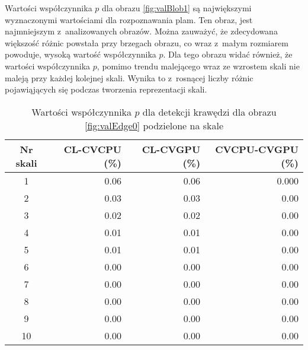 Wartości współczynnika $ p $ dla obrazu \ref{fig:valBlob1} są największymi wyznaczonymi wartościami dla rozpoznawania plam. Ten obraz, jest najmniejszym z~analizowanych obrazów. Można zauważyć, że zdecydowana większość różnic powstała przy brzegach obrazu, co wraz z~małym rozmiarem powoduje, wysoką wartość współczynnika $ p $. Dla tego obrazu widać również, że wartości współczynnika $ p $, pomimo trendu malejącego wraz ze wzrostem skali nie maleją przy każdej kolejnej skali. Wynika to z~rosnącej liczby różnic pojawiąjących się podczas tworzenia reprezentacji skali.

\begin{center}
\begin{table}
\centering
\caption{Wartości współczynnika $ p $ dla detekcji krawędzi dla obrazu \ref{fig:valEdge0} podzielone na skale}
\label{tab:imageScaleEdge0}
\begin{tabular}{|c|r|r|r|}
 \hline
Nr skali & CL-CVCPU (\%) & CL-CVGPU (\%) & CVCPU-CVGPU (\%) \\ \hline
1        & 0.06     & 0.06     & 0.000       \\ \hline
2        & 0.03     & 0.03     & 0.00        \\ \hline
3        & 0.02     & 0.02     & 0.00        \\ \hline
4        & 0.01     & 0.01     & 0.00        \\ \hline
5        & 0.01     & 0.01     & 0.00        \\ \hline
6        & 0.00     & 0.00     & 0.00        \\ \hline
7        & 0.00     & 0.00     & 0.00        \\ \hline
8        & 0.00     & 0.00     & 0.00        \\ \hline
9        & 0.00     & 0.00     & 0.00        \\ \hline
10       & 0.00     & 0.00     & 0.00        \\ \hline
\end{tabular}
\end{table}
\end{center}

